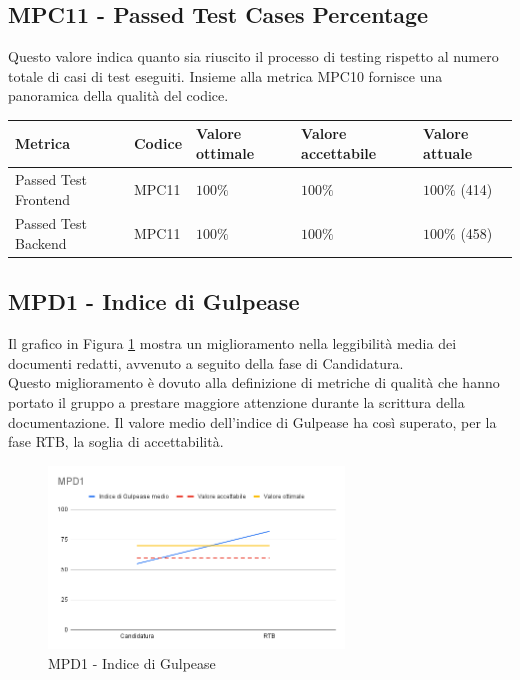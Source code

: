 \subsection{MPC11 - Passed Test Cases Percentage}
Questo valore indica quanto sia riuscito il processo di testing rispetto al numero totale di casi di test eseguiti.
Insieme alla metrica MPC10 fornisce una panoramica della qualità del codice.

\label{s:mpc11}
\begin{table}[H]
    \centering
    \begin{tabularx}{\textwidth}{X|l|l|l|l}
        \hline
        \textbf{Metrica}     & \textbf{Codice} & \textbf{Valore ottimale} & \textbf{Valore accettabile} & \textbf{Valore attuale} \\
        \hline
        Passed Test Frontend & MPC11           & $100\%$                  & $ 100\%$                    & $ 100\%$ (414)          \\
        \hline
        Passed Test Backend  & MPC11           & $100\%$                  & $ 100\%$                    & $ 100\%$ (458)          \\
        \hline
    \end{tabularx}
\end{table}


\subsection{MPD1 - Indice di Gulpease}
\label{s:mpd1}
Il grafico in Figura \ref{fig:mpd1} mostra un miglioramento nella leggibilità media dei documenti redatti, avvenuto a seguito della fase di Candidatura.\\
Questo miglioramento è dovuto alla definizione di metriche di qualità che hanno portato il gruppo a prestare maggiore attenzione durante la scrittura della documentazione.
Il valore medio dell'indice di Gulpease ha così superato, per la fase RTB, la soglia di accettabilità.

\begin{figure}[htbp]
    \centering
    \includegraphics[width=0.7\textwidth]{img/MPD1.png}
    \caption{MPD1 - Indice di Gulpease}
    \label{fig:mpd1}
\end{figure}


